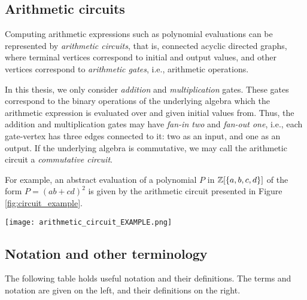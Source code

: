 
\subsection{Arithmetic circuits}
\label{sect:prelims_circuits}

Computing arithmetic expressions such as polynomial evaluations 
can be represented by \emph{arithmetic circuits}, that is, 
connected acyclic directed graphs, where terminal vertices correspond to initial and output values, 
and other vertices correspond to \emph{arithmetic gates}, i.e., arithmetic operations. 

In this thesis, we only consider \emph{addition} and \emph{multiplication} gates. 
These gates correspond to the binary operations of the underlying algebra  
which the arithmetic expression is evaluated over and given initial values from. Thus, 
the addition and multiplication gates may have \emph{fan-in two} and \emph{fan-out one}, 
i.e., each gate-vertex has three edges connected to it: two as an input, and one as an output. 
If the underlying algebra is commutative, we may call the arithmetic circuit a \emph{commutative circuit}. 

For example, an abstract evaluation of a polynomial $P$ in $\mathbb Z[\{a,b,c,d\}]$ of the form 
$P = (ab+cd)^2$ is given by the arithmetic circuit presented in Figure \ref{fig:circuit_example}. 

\begin{SCfigure}[0.5][h]
  \caption{A circuit for evaluating $(ab+cd)^2$. 
  Note that the input terminals have been copied for clarity.}
  \texttt{[image: arithmetic\_circuit\_EXAMPLE.png]}
  \centering
  \label{fig:circuit_example}
\end{SCfigure}

\subsection{Notation and other terminology} 
\label{sect:prelims_other}

The following table holds useful notation and their definitions. 
The terms and notation are given on the left, and their definitions on the right.

